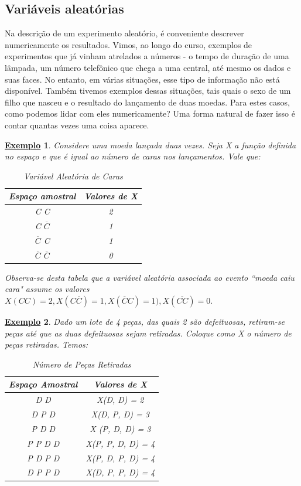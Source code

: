 \documentclass{article}
\newtheorem{example}{\underline{Exemplo}}
\begin{document}
\subsection{Variáveis aleatórias}
  Na descrição de um experimento aleatório, é conveniente descrever numericamente os resultados.
Vimos, ao longo do curso, exemplos de experimentos que já vinham atrelados a números - o tempo de duração
de uma lâmpada, um número telefônico que chega a uma central, até mesmo os dados e suas faces. No entanto,
em várias situações, esse tipo de informação não está disponível. Também tivemos exemplos
dessas situações, tais quais o sexo de um filho que nasceu e o resultado do lançamento de duas moedas.
Para estes casos, como podemos lidar com eles numericamente? Uma forma natural de fazer
isso é contar quantas vezes uma coisa aparece.
\begin{example}
  Considere uma moeda lançada duas vezes. Seja X a função definida no espaço e que é
igual ao número de caras nos lançamentos. Vale que:
\begin{center}
  \begin{table}[h!]
  \caption{Variável Aleatória de Caras}
  \centering
    \begin{tabular}{| c | c |}
      \hline
      Espaço amostral & Valores de X\\
      \hline
      C C & 2\\
      C \(\overline{C}\) & 1\\
      \(\overline{C}\) C & 1\\
      \(\overline{C}\) \(\overline{C}\) & 0\\
      \hline
    \end{tabular}
  \end{table}
\end{center}
  Observa-se desta tabela que a variável aleatória associada ao evento ``moeda caiu cara" assume os valores
 \(X(CC) = 2, X(C\overline{C})=1, X(\overline{C}C)=1), X(\overline{CC}) = 0.\)
\end{example}
\begin{example}
  Dado um lote de 4 peças, das quais 2 são defeituosas, retiram-se peças até que as duas defeituosas
sejam retiradas. Coloque como X o número de peças retiradas. Temos:
\begin{center}
  \begin{table}[h]
  \caption{Número de Peças Retiradas}
  \centering
    \begin{tabular}{| c | c |}
      \hline
      Espaço Amostral & Valores de X\\
      \hline
      D D & X(D, D) = 2\\
      D P D & X(D, P, D) = 3\\
      P D D & X (P, D, D) = 3\\
      P P D D & X(P, P, D, D) = 4\\
      P D P D & X(P, D, P, D) = 4\\
      D P P D & X(D, P, P, D) = 4\\
      \hline
    \end{tabular}
  \end{table}
\end{center}
\end{example}
\end{document}
